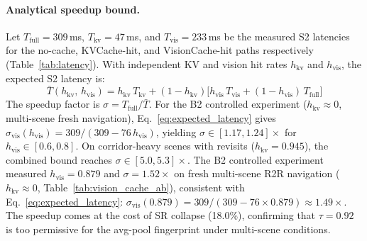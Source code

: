 \documentclass[10pt,twocolumn,letterpaper]{article}
\begin{document}
\paragraph{Analytical speedup bound.}
Let $T_\text{full}=309$\,ms, $T_\text{kv}=47$\,ms, and $T_\text{vis}=233$\,ms be the measured S2 latencies for the no-cache, KVCache-hit, and VisionCache-hit paths respectively (Table~\ref{tab:latency}). With independent KV and vision hit rates $h_\text{kv}$ and $h_\text{vis}$, the expected S2 latency is:
\begin{equation}
  \bar{T}(h_\text{kv},\,h_\text{vis}) = h_\text{kv}\,T_\text{kv} + (1-h_\text{kv})\bigl[h_\text{vis}\,T_\text{vis} + (1-h_\text{vis})\,T_\text{full}\bigr]
  \label{eq:expected_latency}
\end{equation}
The speedup factor is $\sigma = T_\text{full}/\bar{T}$.
For the B2 controlled experiment ($h_\text{kv}{\approx}0$, multi-scene fresh navigation), Eq.~\ref{eq:expected_latency} gives $\sigma_\text{vis}(h_\text{vis}) = 309/(309 - 76\,h_\text{vis})$, yielding $\sigma \in [1.17, 1.24]\times$ for $h_\text{vis}\in[0.6,0.8]$.
On corridor-heavy scenes with revisits ($h_\text{kv}=0.945$), the combined bound reaches $\sigma \in [5.0, 5.3]\times$.
The B2 controlled experiment measured $h_\text{vis}=0.879$ and $\sigma=1.52\times$ on fresh multi-scene R2R navigation ($h_\text{kv}{\approx}0$, Table~\ref{tab:vision_cache_ab}), consistent with Eq.~\ref{eq:expected_latency}: $\sigma_\text{vis}(0.879)=309/(309-76\times0.879)\approx1.49\times$. The speedup comes at the cost of SR collapse (18.0\%), confirming that $\tau=0.92$ is too permissive for the avg-pool fingerprint under multi-scene conditions.
\end{document}
